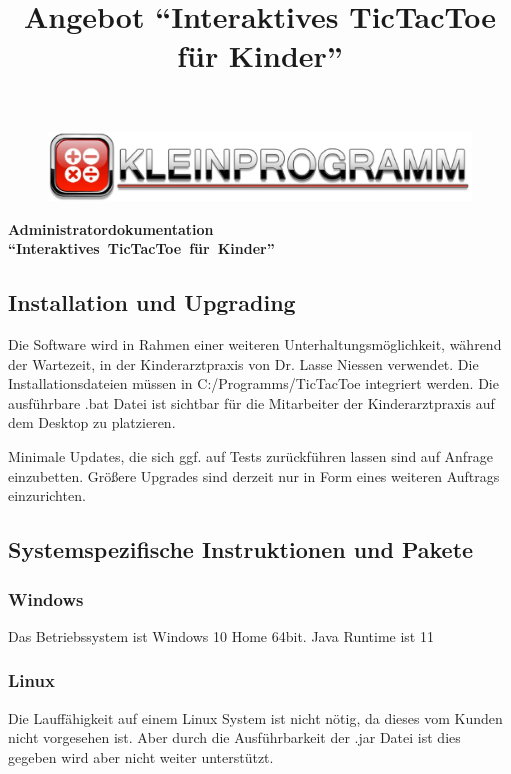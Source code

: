 \documentclass[12pt]{article}
\title{Angebot "`Interaktives TicTacToe für Kinder"'}
\begin{document}
\begin{center}
\begin{figure}
\includegraphics[scale=0.9]{banner.pdf}
\end{figure}
\end{center}



\vspace*{10mm}

\large \textbf{Administratordokumentation \\ "`Interaktives\ TicTacToe\ für\ Kinder"'}



\vspace*{7mm}

\tableofcontents
\newpage

\subsection{Installation und Upgrading}
Die Software wird in Rahmen einer weiteren Unterhaltungsmöglichkeit, während der Wartezeit, in der Kinderarztpraxis von Dr. Lasse Niessen verwendet. Die Installationsdateien  müssen in C:/Programms/TicTacToe integriert werden. 
Die ausführbare .bat Datei ist sichtbar für die Mitarbeiter der Kinderarztpraxis auf dem Desktop zu platzieren.

Minimale Updates, die sich ggf. auf Tests zurückführen lassen sind auf Anfrage einzubetten.
Größere Upgrades sind derzeit nur in Form eines weiteren Auftrags einzurichten.
\subsection{Systemspezifische Instruktionen und Pakete}
\subsubsection{Windows}
Das Betriebssystem ist Windows 10 Home 64bit.
Java Runtime ist 11
\subsubsection{Linux}
Die Lauffähigkeit auf einem Linux System ist nicht nötig, da dieses vom Kunden nicht vorgesehen ist. Aber durch die Ausführbarkeit der .jar Datei ist dies gegeben wird aber nicht weiter unterstützt.
\end{document}
